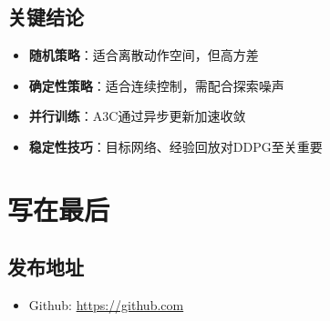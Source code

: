 \subsection{关键结论}
\begin{itemize}
    \item \textbf{随机策略}：适合离散动作空间，但高方差
    \item \textbf{确定性策略}：适合连续控制，需配合探索噪声
    \item \textbf{并行训练}：A3C通过异步更新加速收敛
    \item \textbf{稳定性技巧}：目标网络、经验回放对DDPG至关重要
\end{itemize}


\section{写在最后}
\subsection{发布地址}
\begin{itemize}
    \item Github: 
    \url{https://github.com}

\end{itemize}
